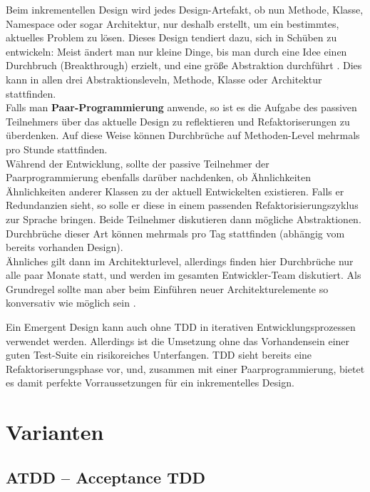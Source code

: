 Beim inkrementellen Design wird jedes Design-Artefakt, ob nun Methode, Klasse, Namespace oder sogar Architektur, nur deshalb erstellt, um ein bestimmtes, aktuelles Problem zu lösen. Dieses Design tendiert dazu, sich in Schüben zu entwickeln: Meist ändert man nur kleine Dinge, bis man durch eine Idee einen Durchbruch (Breakthrough) erzielt, und eine größe Abstraktion durchführt \cite{shore_art_2007,evans_domain_driven_2003}. Dies kann in allen drei Abstraktionsleveln, Methode, Klasse oder Architektur stattfinden.\\
Falls man \textbf{Paar-Programmierung} anwende, so ist es die Aufgabe des passiven Teilnehmers über das aktuelle Design zu reflektieren und Refaktoriserungen zu überdenken. Auf diese Weise können Durchbrüche auf Methoden-Level mehrmals pro Stunde stattfinden.\\
Während der Entwicklung, sollte der passive Teilnehmer der Paarprogrammierung ebenfalls darüber nachdenken, ob Ähnlichkeiten Ähnlichkeiten anderer Klassen zu der aktuell Entwickelten existieren. Falls er Redundanzien sieht, so solle er diese in einem passenden Refaktorisierungszyklus zur Sprache bringen. Beide Teilnehmer diskutieren dann mögliche Abstraktionen. Durchbrüche dieser Art können mehrmals pro Tag stattfinden (abhängig vom bereits vorhanden Design).\\
Ähnliches gilt dann im Architekturlevel, allerdings finden hier Durchbrüche nur alle paar Monate statt, und werden im gesamten Entwickler-Team diskutiert. Als Grundregel sollte man aber beim Einführen neuer Architekturelemente so konversativ wie möglich sein \citep{shore_art_2007}.

Ein Emergent Design kann auch ohne TDD in iterativen Entwicklungsprozessen verwendet werden. Allerdings ist die Umsetzung ohne das Vorhandensein einer guten Test-Suite ein risikoreiches Unterfangen. TDD sieht bereits eine Refaktoriserungsphase vor, und, zusammen mit einer Paarprogrammierung, bietet es damit perfekte Vorraussetzungen für ein inkrementelles Design.

\section{Varianten}
\subsection{ATDD -- Acceptance TDD}
\label{sec:attd}


